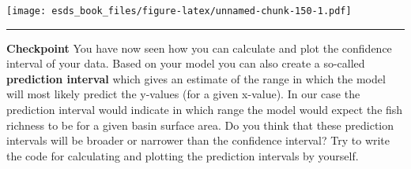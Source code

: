 \documentclass[
]{book}
\newenvironment{Shaded}{\begin{snugshade}}{\end{snugshade}}
\newcommand{\DataTypeTok}[1]{\textcolor[rgb]{0.13,0.29,0.53}{#1}}
\newcommand{\KeywordTok}[1]{\textcolor[rgb]{0.13,0.29,0.53}{\textbf{#1}}}
\newcommand{\NormalTok}[1]{#1}
\newcommand{\OperatorTok}[1]{\textcolor[rgb]{0.81,0.36,0.00}{\textbf{#1}}}
\newcommand{\StringTok}[1]{\textcolor[rgb]{0.31,0.60,0.02}{#1}}
\begin{document}
\begin{Shaded}
\end{Shaded}

\texttt{[image: esds\_book\_files/figure-latex/unnamed-chunk-150-1.pdf]}

\begin{center}\rule{0.5\linewidth}{0.5pt}\end{center}

\textbf{Checkpoint}
You have now seen how you can calculate and plot the confidence interval of your data. Based on your model you can also create a so-called \textbf{prediction interval} which gives an estimate of the range in which the model will most likely predict the y-values (for a given x-value). In our case the prediction interval would indicate in which range the model would expect the fish richness to be for a given basin surface area. Do you think that these prediction intervals will be broader or narrower than the confidence interval? Try to write the code for calculating and plotting the prediction intervals by yourself.
\end{document}
